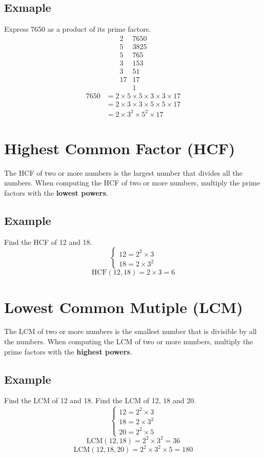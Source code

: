\documentclass[a4paper,12pt]{article}
\begin{document}
\subsection{Exmaple}
Express 7650 as a product of its prime factors.
\[\begin{array}{r|l}
    2&7650\\
    5&3825\\
    5&765\\
    3&153\\
    3&51\\
    17&17\\
    &1
\end{array}\]
\[\begin{aligned}
    7650&=2\times5\times5\times3\times3\times17\\
    &=2\times3\times3\times5\times5\times17\\
    &=\boxed{2\times3^2\times5^2\times17}
\end{aligned}\]

\section{Highest Common Factor (HCF)}
The HCF of two or more numbers is the largest number
that divides all the numbers. When computing the HCF of two or more numbers, multiply the prime factors with the {\bf lowest powers}.
\subsection{Example}
Find the HCF of 12 and 18.
\[\begin{cases}
    12=2^2\times3\\
    18=2\times3^2
\end{cases}\]
\[\text{HCF}(12,18)=2\times3=\boxed{6}\]

\section{Lowest Common Mutiple (LCM)}
The LCM of two or more numbers is the smallest number
that is divisible by all the numbers. When computing the LCM of two or more numbers, multiply the prime factors with the {\bf highest powers}.
\subsection{Example}
Find the LCM of 12 and 18. Find the LCM of 12, 18 and 20.	
\[\begin{cases}
    12=2^2\times3\\
    18=2\times3^2\\
    20=2^2\times5
\end{cases}\]
\[\text{LCM}(12,18)=2^2\times3^2=\boxed{36}\]
\[\text{LCM}(12,18,20)=2^2\times3^2\times5=\boxed{180}\]
\end{document}
